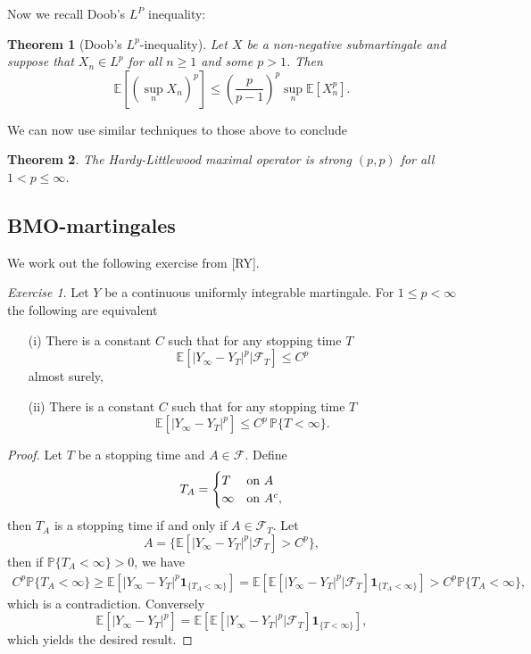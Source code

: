 \documentclass[11pt]{article}
\newtheorem{thm}{Theorem}
\theoremstyle{remark}
\newtheorem{exr}{Exercise}
\newcommand{\calF}{\mathcal{F}}
\newcommand{\1}{\textbf{1}}
\newcommand{\bbP}{\mathbb{P}}
\newcommand{\bbE}{\mathbb{E}}
\begin{document}
Now we recall Doob's $L^P$ inequality:
\begin{thm}[Doob's $L^p$-inequality]
Let $X$ be a non-negative submartingale and suppose that $X_n \in L^p$ for all $n \geq 1$ and some $p >1$. Then
\[
\bbE\left[\left(\sup_n X_n\right)^p \right] \leq \left(\frac{p}{p-1}\right)^p \sup_n \bbE[X_n^p].
\]
\end{thm}
We can now use similar techniques to those above to conclude
\begin{thm}
The Hardy-Littlewood maximal operator is strong $(p,p)$ for all $1 < p \leq \infty$.
\end{thm}

\subsection*{BMO-martingales}
We work out the following exercise from [RY].
\begin{exr}
Let $Y$ be a continuous uniformly integrable martingale. For $1 \leq p < \infty$ the following are equivalent
\begin{enumerate}
\item[(i)] There is a constant $C$ such that for any stopping time $T$
\[
\bbE[|Y_\infty - Y_T|^p | \calF_T] \leq C^p
\]
almost surely,
\item[(ii)] There is a constant $C$ such that for any stopping time $T$
\[
\bbE[|Y_\infty - Y_T|^p] \leq C^p \, \bbP\{T < \infty\}.
\]
\end{enumerate}
\begin{proof}
Let $T$ be a stopping time and $A \in \calF$. Define
\[
T_A = \begin{cases}
T & \textup{on }A \\
\infty & \textup{on }A^c,
\end{cases}
\]
then $T_A$ is a stopping time if and only if $A \in \calF_T$. Let
\[
A = \{\bbE[|Y_\infty - Y_T|^p | \calF_T] > C^p \},
\]
then if $\bbP\{T_A < \infty\} > 0$, we have
\begin{align*}
C^p \bbP\{T_A < \infty\} \geq \bbE[|Y_\infty - Y_T|^p \textbf{1}_{\{T_A < \infty\}}] = \bbE[\bbE[|Y_\infty - Y_T|^p | \calF_T] \textbf{1}_{\{T_A < \infty\}}] > C^p  \bbP\{T_A < \infty\},
\end{align*}
which is a contradiction. Conversely
\[
\bbE[|Y_\infty - Y_T|^p] = \bbE[ \bbE[|Y_\infty - Y_T|^p | \calF_T] \textbf{1}_{\{T < \infty\}}],
\]
which yields the desired result.
\end{proof}
\end{exr}
\end{document}
